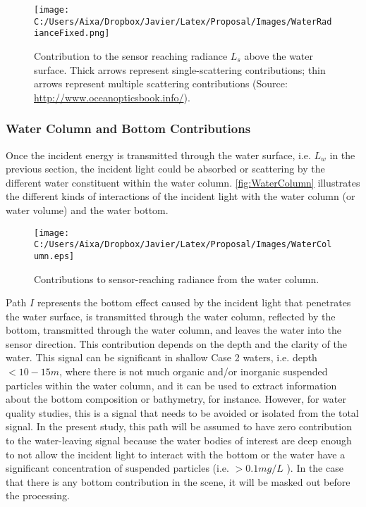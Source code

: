 \begin{figure}[htb]
  \centering
  \texttt{[image: C:/Users/Aixa/Dropbox/Javier/Latex/Proposal/Images/WaterRadianceFixed.png]}
\caption{Contribution to the sensor reaching radiance $L_s$ above the water surface. Thick arrows represent single-scattering contributions; thin arrows represent multiple scattering contributions (Source: \protect\url{http://www.oceanopticsbook.info/}).}
\label{fig:watercontribution} 
\end{figure}
\subsubsection{Water Column and Bottom Contributions}
Once the incident energy is transmitted through the water surface, i.e. $L_w$ in the previous section, the incident light could be absorbed or scattering by the different water constituent within the water column. \autoref{fig:WaterColumn} illustrates the different kinds of interactions of the incident light with the water column (or water volume) and the water bottom.

\begin{figure}[htb]
  \centering
      \texttt{[image: C:/Users/Aixa/Dropbox/Javier/Latex/Proposal/Images/WaterColumn.eps]}
  \caption{Contributions to sensor-reaching radiance from the water column.}
  \label{fig:WaterColumn}
\end{figure}

Path $I$ represents the bottom effect caused by the incident light that penetrates the water surface, is transmitted through the water column, reflected by the bottom, transmitted through the water column, and leaves the water into the sensor direction. This contribution depends on the depth and the clarity of the water. This signal can be significant in shallow Case 2 waters, i.e. depth $<10-15m$, where there is not much organic and/or inorganic suspended particles within the water column, and it can be used to extract information about the bottom composition or bathymetry, for instance. However, for water quality studies, this is a signal that needs to be avoided or isolated from the total signal. In the present study, this path will be assumed to have zero contribution to the water-leaving signal because the water bodies of interest are deep enough to not allow the incident light to interact with the bottom or the water have a significant concentration of suspended particles (i.e. $>0.1mg/L$ \cite{Pahlevan:2012}). In the case that there is any bottom contribution in the scene, it will be masked out before the processing.

